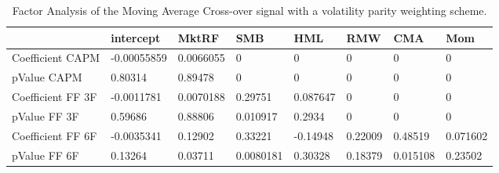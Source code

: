 \begin{table}[H]
\centering
\begin{tabular}{llllllll}
\hline& intercept & MktRF & SMB & HML & RMW & CMA & Mom \\ 
\hline 
Coefficient CAPM & -0.00055859 & 0.0066055 & 0 & 0 & 0 & 0 & 0 \\ 
pValue CAPM & 0.80314 & 0.89478 & 0 & 0 & 0 & 0 & 0 \\ 
Coefficient FF 3F & -0.0011781 & 0.0070188 & 0.29751 & 0.087647 & 0 & 0 & 0 \\ 
pValue FF 3F & 0.59686 & 0.88806 & 0.010917 & 0.2934 & 0 & 0 & 0 \\ 
Coefficient FF 6F & -0.0035341 & 0.12902 & 0.33221 & -0.14948 & 0.22009 & 0.48519 & 0.071602 \\ 
pValue FF 6F & 0.13264 & 0.03711 & 0.0080181 & 0.30328 & 0.18379 & 0.015108 & 0.23502 \\ 
\hline
\end{tabular}
\caption{Factor Analysis of the Moving Average Cross-over signal with a volatility parity weighting scheme.}
\label{MAVP_FACTOR}
\end{table}